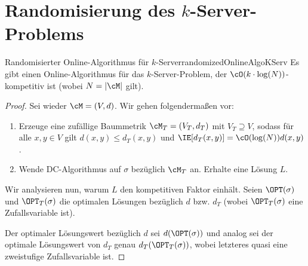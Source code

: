 \documentclass[language=ngerman,algolist]{TemplateLecture}
\begin{document}

\section{Randomisierung des $k$-Server-Problems}

\begin{thm}{Randomisierter Online-Algorithmus für $k$-Server}{randomizedOnlineAlgoKServ}
    Es gibt einen Online-Algorithmus für das $k$-Server-Problem, der $\cO(k \cdot \log(N))$-kompetitiv ist (wobei $N = |\cM|$ gilt).
\end{thm}

\begin{proof}
    Sei wieder $\cM = (V, d)$. Wir gehen folgendermaßen vor:
    \begin{enumerate}
        \item Erzeuge eine zufällige Baummetrik $\cM_T = (V_T, d_T)$ mit $V_T \supseteq V$, sodass für alle $x,y \in V$ gilt $d(x,y) \leq d_T(x,y)$ und $\IE[d_T(x,y)] = \cO(\log(N)) d(x,y)$.
        \item Wende DC-Algorithmus auf $\sigma$ bezüglich $\cM_T$ an. Erhalte eine Lösung $L$.
    \end{enumerate}

    Wir analysieren nun, warum $L$ den kompetitiven Faktor einhält. Seien $\OPT(\sigma)$ und $\OPT_T(\sigma)$ die optimalen Lösungen bezüglich $d$ bzw. $d_T$ (wobei $\OPT_T(\sigma)$ eine Zufallsvariable ist).

    Der optimaler Lösungswert bezüglich $d$ sei $d(\OPT(\sigma))$ und analog sei der optimale Lösungswert von $d_T$ genau $d_T(\OPT_T(\sigma))$, wobei letzteres quasi eine zweistufige Zufallsvariable ist.


\end{proof}
\end{document}
